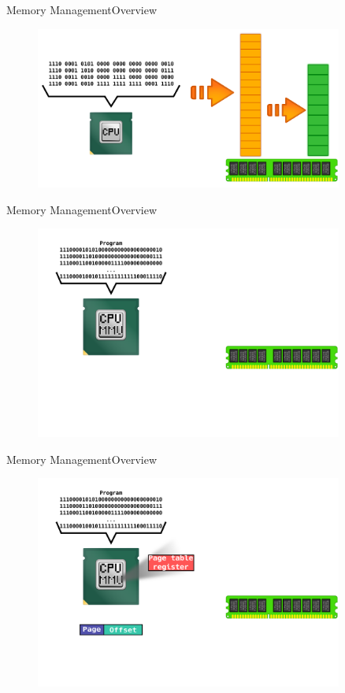 \documentclass[10pt]{beamer}
\begin{document}
\begin{frame}{Memory Management}{Overview}
  \begin{figure}[ht]
    \centering
    \includegraphics[width=0.9\textwidth, keepaspectratio=true]{images/virtual_memory_c.png}
  \end{figure}
\end{frame}

\begin{frame}{Memory Management}{Overview}
  \begin{figure}[ht]
    \centering
    \includegraphics[width=0.9\textwidth, keepaspectratio=true]{images/mmu_a.png}
  \end{figure}
\end{frame}

\begin{frame}{Memory Management}{Overview}
  \begin{figure}[ht]
    \centering
    \includegraphics[width=0.9\textwidth, keepaspectratio=true]{images/mmu_b.png}
  \end{figure}
\end{frame}
\end{document}
